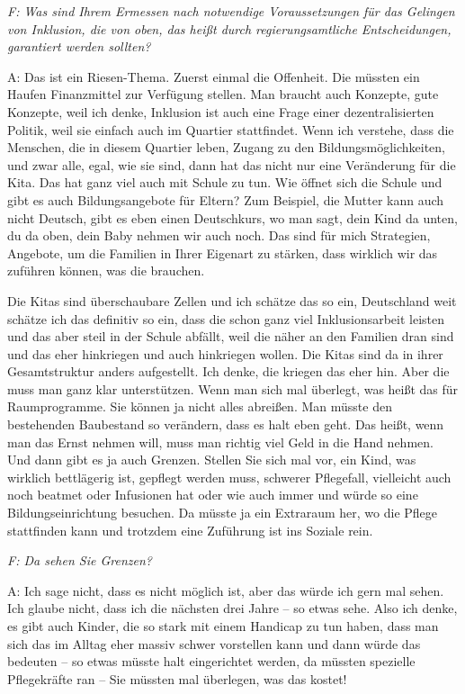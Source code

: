 \begin{linenumbers*}
\emph{F: Was sind Ihrem Ermessen nach notwendige Voraussetzungen für das Gelingen von Inklusion, die von oben, das heißt durch regierungsamtliche Entscheidungen, garantiert werden sollten?}

A: Das ist ein Riesen-Thema. Zuerst einmal die Offenheit. Die müssten ein Haufen Finanzmittel zur Verfügung stellen. Man braucht auch Konzepte, gute Konzepte, weil ich denke, Inklusion ist auch eine Frage einer dezentralisierten Politik, weil sie einfach auch im Quartier stattfindet. Wenn ich verstehe, dass die Menschen, die in diesem Quartier leben, Zugang zu den Bildungsmöglichkeiten, und zwar alle, egal, wie sie sind, dann hat das nicht nur eine Veränderung für die Kita. Das hat ganz viel auch mit Schule zu tun. Wie öffnet sich die Schule und gibt es auch Bildungsangebote für Eltern? Zum Beispiel, die Mutter kann auch nicht Deutsch, gibt es eben einen Deutschkurs, wo man sagt, dein Kind da unten, du da oben, dein Baby nehmen wir auch noch. Das sind für mich Strategien, Angebote, um die Familien in Ihrer Eigenart zu stärken, dass wirklich wir das zuführen können, was die brauchen. 

Die Kitas sind überschaubare Zellen und ich schätze das so ein, Deutschland weit schätze ich das definitiv so ein, dass die schon ganz viel Inklusionsarbeit leisten und das aber steil in der Schule abfällt, weil die näher an den Familien dran sind und das eher hinkriegen und auch hinkriegen wollen. Die Kitas sind da in ihrer Gesamtstruktur anders aufgestellt. Ich denke, die kriegen das eher hin. Aber die muss man ganz klar unterstützen. Wenn man sich mal überlegt, was heißt das für Raumprogramme. Sie können ja nicht alles abreißen. Man müsste den bestehenden Baubestand so verändern, dass es halt eben geht. Das heißt, wenn man das Ernst nehmen will, muss man richtig viel Geld in die Hand nehmen.  
Und dann gibt es ja auch Grenzen. Stellen Sie sich mal vor, ein Kind, was wirklich bettlägerig ist, gepflegt werden muss, schwerer Pflegefall, vielleicht auch noch beatmet oder Infusionen hat oder wie auch immer und würde so eine Bildungseinrichtung besuchen. Da müsste ja ein Extraraum her, wo die Pflege stattfinden kann und trotzdem eine Zuführung ist ins Soziale rein. 

\emph{F: Da sehen Sie Grenzen?}

A: Ich sage nicht, dass es nicht möglich ist, aber das würde ich gern mal sehen. Ich glaube nicht, dass ich die nächsten drei Jahre -- so etwas sehe. Also ich denke, es gibt auch Kinder, die so stark mit einem Handicap zu tun haben, dass man sich das im Alltag eher massiv schwer vorstellen kann und dann würde das bedeuten -- so etwas müsste halt eingerichtet werden, da müssten spezielle Pflegekräfte ran -- Sie müssten mal überlegen, was das kostet! 


\end{linenumbers*}
